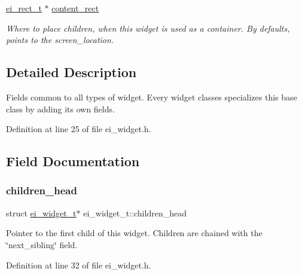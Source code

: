 \begin{DoxyCompactItemize}
\hyperlink{structei__rect__t}{ei\+\_\+rect\+\_\+t} $\ast$ \hyperlink{structei__widget__t_a75c29d388a5f5b32cdd8a9c855bc2a75}{content\+\_\+rect}
\begin{DoxyCompactList}\small\item\em Where to place children, when this widget is used as a container. By defaults, points to the screen\+\_\+location. \end{DoxyCompactList}\end{DoxyCompactItemize}


\subsection{Detailed Description}
Fields common to all types of widget. Every widget classes specializes this base class by adding its own fields. 

Definition at line 25 of file ei\+\_\+widget.\+h.



\subsection{Field Documentation}
\mbox{\label{structei__widget__t_a190316f0ec41d2d98b919414c860f828}} 
\subsubsection{\texorpdfstring{children\+\_\+head}{children\_head}}
{\footnotesize\ttfamily struct \hyperlink{structei__widget__t}{ei\+\_\+widget\+\_\+t}$\ast$ ei\+\_\+widget\+\_\+t\+::children\+\_\+head}



Pointer to the first child of this widget. Children are chained with the \char`\"{}next\+\_\+sibling\char`\"{} field. 



Definition at line 32 of file ei\+\_\+widget.\+h.

\mbox{\label{structei__widget__t_aece2f3059f252538ae787857e7eea2a2}} 
